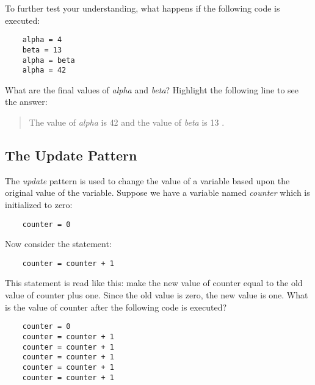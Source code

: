 To further test your understanding, what happens if the following
code is executed:

\color{CodeGreen}
\begin{codesize}
\begin{verbatim}
    alpha = 4
    beta = 13
    alpha = beta
    alpha = 42
\end{verbatim}
\end{codesize}
\color{black}

What are the final values of {\it alpha}  and {\it beta}?
\W Highlight the following line to see the answer:

\begin{quote}
    The value of {\it alpha} is 
    {
    \T\color{black}
    \W\color{white}
    42
    }
    and the value of {\it beta} is 
    {
    \T\color{black}
    \W\color{white}
    13
    }.
\end{quote}

\subsection{The Update Pattern}

The {\it update} pattern is used to  change the value of a
variable based upon the original value of the variable.
Suppose we have a variable named {\it counter} which is initialized
to zero:

\color{CodeGreen}
\begin{codesize}
\begin{verbatim}
    counter = 0
\end{verbatim}
\end{codesize}
\color{black}

Now consider the statement:

\color{CodeGreen}
\begin{codesize}
\begin{verbatim}
    counter = counter + 1
\end{verbatim}
\end{codesize}
\color{black}

This statement is read like this:
make the new value of counter equal to the old value
of counter plus one. Since the old value is zero, the
new value is one.
What is the value of counter after the following
code is executed?

\color{CodeGreen}
\begin{codesize}
\begin{verbatim}
    counter = 0
    counter = counter + 1
    counter = counter + 1
    counter = counter + 1
    counter = counter + 1
    counter = counter + 1
\end{verbatim}
\end{codesize}
\color{black}


